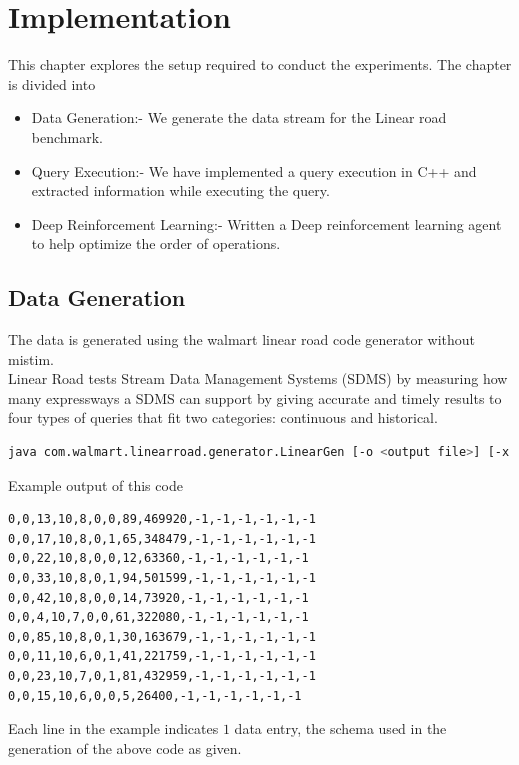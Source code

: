 \chapter{Implementation}
\label{chapter:implementation}
\thispagestyle{myheadings}

\graphicspath{{./4_Implementation/}}
This chapter explores the setup required to conduct the experiments. The chapter is divided into 
\begin{itemize}
\item Data Generation:- We generate the data stream for the Linear road benchmark.
\item Query Execution:- We have implemented a query execution in C++ and extracted information while executing the query.
\item Deep Reinforcement Learning:- Written a Deep reinforcement learning agent to help optimize the order of operations.
\end{itemize}

\section{Data Generation}
The data is generated using the walmart linear road code generator without \\ mistim\cite{walmart_linearoad}.\\
Linear Road tests Stream Data Management Systems (SDMS) by measuring how many expressways a SDMS can support by giving accurate and timely results to four types of queries that fit two categories: continuous and historical.\cite{linearroad_website}
\begin{lstlisting}[language=bash, caption= generate linear road data, label={lst:linear road data generation}]
java com.walmart.linearroad.generator.LinearGen [-o <output file>] [-x <number of xways>] [-m <dummy value to activate multi-threading>]
\end{lstlisting}
Example output of this code
\begin{lstlisting}[caption= linear road data example output]
0,0,13,10,8,0,0,89,469920,-1,-1,-1,-1,-1,-1
0,0,17,10,8,0,1,65,348479,-1,-1,-1,-1,-1,-1
0,0,22,10,8,0,0,12,63360,-1,-1,-1,-1,-1,-1
0,0,33,10,8,0,1,94,501599,-1,-1,-1,-1,-1,-1
0,0,42,10,8,0,0,14,73920,-1,-1,-1,-1,-1,-1
0,0,4,10,7,0,0,61,322080,-1,-1,-1,-1,-1,-1
0,0,85,10,8,0,1,30,163679,-1,-1,-1,-1,-1,-1
0,0,11,10,6,0,1,41,221759,-1,-1,-1,-1,-1,-1
0,0,23,10,7,0,1,81,432959,-1,-1,-1,-1,-1,-1
0,0,15,10,6,0,0,5,26400,-1,-1,-1,-1,-1,-1
\end{lstlisting}
Each line in the example indicates $1$ data entry, the schema used in the generation of the above code as given.
